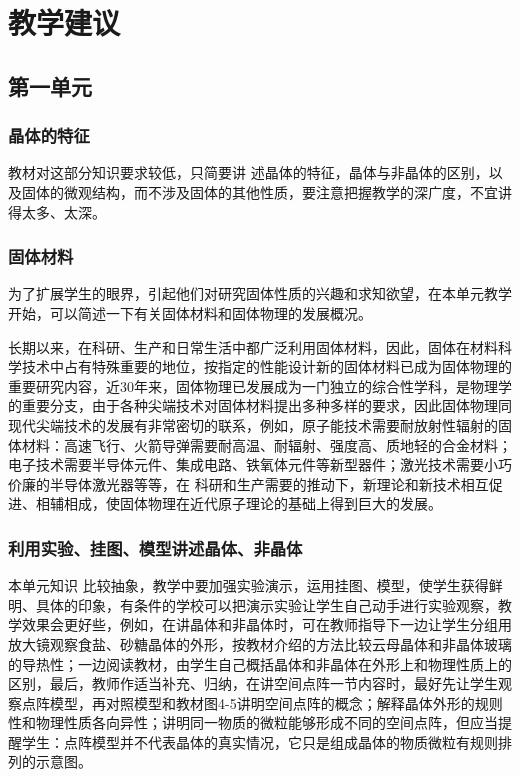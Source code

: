 \section{教学建议}
\subsection{第一单元}
\subsubsection{晶体的特征}

教材对这部分知识要求较低，只简要讲
述晶体的特征，晶体与非晶体的区别，以及固体的微观结构，而不涉及固体的其他性质，要注意把握教学的深广度，不宜讲得太多、太深。

\subsubsection{固体材料}
 为了扩展学生的眼界，引起他们对研究固体性质的兴趣和求知欲望，在本单元教学开始，可以简述一下有关固体材料和固体物理的发展概况。

 长期以来，在科研、生产和日常生活中都广泛利用固体材料，因此，固体在材料科学技术中占有特殊重要的地位，按指定的性能设计新的固体材料已成为固体物理的重要研究内容，近30年来，固体物理已发展成为一门独立的综合性学科，是物理学的重要分支，由于各种尖端技术对固体材料提出多种多样的要求，因此固体物理同现代尖端技术的发展有非常密切的联系，例如，原子能技术需要耐放射性辐射的固体材料：高速飞行、火箭导弹需要耐高温、耐辐射、强度高、质地轻的合金材料；电子技术需要半导体元件、集成电路、铁氧体元件等新型器件；激光技术需要小巧价廉的半导体激光器等等，在
 科研和生产需要的推动下，新理论和新技术相互促进、相辅相成，使固体物理在近代原子理论的基础上得到巨大的发展。

 \subsubsection{利用实验、挂图、模型讲述晶体、非晶体}
 
 本单元知识
 比较抽象，教学中要加强实验演示，运用挂图、模型，使学生获得鲜明、具体的印象，有条件的学校可以把演示实验让学生自己动手进行实验观察，教学效果会更好些，例如，在讲晶体和非晶体时，可在教师指导下一边让学生分组用放大镜观察食盐、砂糖晶体的外形，按教材介绍的方法比较云母晶体和非晶体玻璃的导热性；一边阅读教材，由学生自己概括晶体和非晶体在外形上和物理性质上的区别，最后，教师作适当补充、归纳，在讲空间点阵一节内容时，最好先让学生观察点阵模型，再对照模型和教材图4-5讲明空间点阵的概念；解释晶体外形的规则性和物理性质各向异性；讲明同一物质的微粒能够形成不同的空间点阵，但应当提醒学生：点阵模型并不代表晶体的真实情况，它只是组成晶体的物质微粒有规则排列的示意图。

